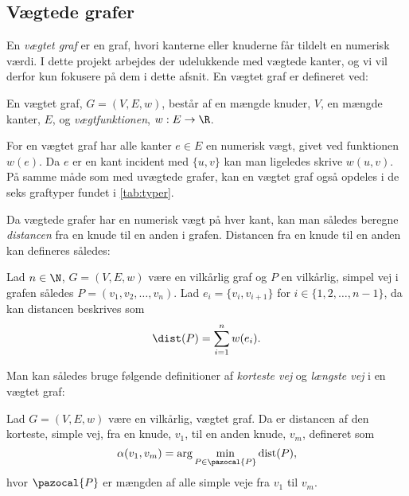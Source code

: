\subsection{Vægtede grafer} \label{kap:vaegtede}
En \emph{vægtet graf} er en graf, hvori kanterne eller knuderne får tildelt en numerisk værdi. I dette projekt arbejdes der udelukkende med vægtede kanter, og vi vil derfor kun fokusere på dem i dette afsnit.
En vægtet graf er defineret ved:
\begin{defn}
En vægtet graf, $G=(V,E,w)$, består af en mængde knuder, $V$, en mængde kanter, $E$, og \emph{vægtfunktionen}, $w: E \rightarrow \R$.
\end{defn}

For en vægtet graf har alle kanter $e\in E$ en numerisk vægt, givet ved funktionen $w (e)$. Da $e$ er en kant incident med $\{u,v\}$ kan man ligeledes skrive $w (u,v)$. På samme måde som med uvægtede grafer, kan en vægtet graf også opdeles i de seks graftyper fundet i \autoref{tab:typer}.


Da vægtede grafer har en numerisk vægt på hver kant, kan man således beregne \emph{distancen} fra en knude til en anden i grafen. Distancen fra en knude til en anden kan defineres således:

\begin{defn}[Distance]
Lad $n \in \N $, $G=(V,E,w)$ være en vilkårlig graf og $P$ en vilkårlig, simpel vej i grafen således $P=(v_{1},v_{2},\dotsc,v_{n})$. Lad $e_i = \{v_i,v_{i+1}\}$ for $i \in \{ 1, 2, \dotsc, n-1 \}$, da kan distancen beskrives som
	\begin{equation}
	\dist(P)=\sum_{i=1}^{n}w(e_i).
	\end{equation}  
\end{defn}

Man kan således bruge følgende definitioner af \emph{korteste vej} og \emph{længste vej} i en vægtet graf:


\begin{defn} \label{defn:min.vej}
Lad $G=(V,E,w)$ være en vilkårlig, vægtet graf. Da er distancen af den korteste, simple vej, fra en knude, $v_1$, til en anden knude, $v_m$, defineret som
	\begin{equation}
		\alpha(v_1,v_m)=\arg \min_{P \in \pazocal{P}}
		\textrm{dist}(P),
	\end{equation}
	hvor $\pazocal{P}$ er mængden af alle simple veje fra $v_1$ til $v_m$.
\end{defn}

